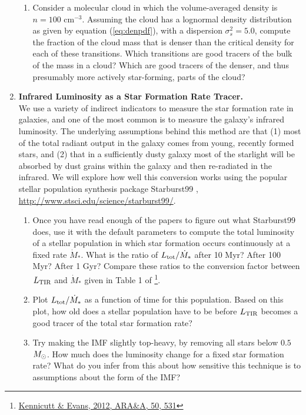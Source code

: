 \begin{enumerate}
\begin{enumerate}
\item Consider a molecular cloud in which the volume-averaged density is $n=100$ cm$^{-3}$. Assuming the cloud has a lognormal density distribution as given by equation (\ref{eq:denpdf}), with a dispersion $\sigma_s^2 = 5.0$, compute the fraction of the cloud mass that is denser than the critical density for each of these transitions. Which transitions are good tracers of the bulk of the mass in a cloud? Which are good tracers of the denser, and thus presumably more actively star-forming, parts of the cloud?
\end{enumerate} 

\vspace{0.2in}

\item \textbf{Infrared Luminosity as a Star Formation Rate Tracer.}\\
We use a variety of indirect indicators to measure the star formation rate in galaxies, and one of the most common is to measure the galaxy's infrared luminosity. The underlying assumptions behind this method are that (1) most of the total radiant output in the galaxy comes from young, recently formed stars, and (2) that in a sufficiently dusty galaxy most of the starlight will be absorbed by dust grains within the galaxy and then re-radiated in the infrared. We will explore how well this conversion works using the popular stellar population synthesis package Starburst99 \citep{leitherer99a, vazquez05a}, \url{http://www.stsci.edu/science/starburst99/}.
\begin{enumerate}
\item Once you have read enough of the papers to figure out what Starburst99 does, use it with the default parameters to compute the total luminosity of a stellar population in which star formation occurs continuously at a fixed rate $\dot{M}_*$. What is the ratio of $L_{\rm tot}/\dot{M}_*$ after 10 Myr? After 100 Myr? After 1 Gyr? Compare these ratios to the conversion factor between $L_{\rm TIR}$ and $\dot{M}_*$ given in Table 1 of \citet{kennicutt12a}\footnote{\href{http://adsabs.harvard.edu/abs/2012ARA\%26A..50..531K}{Kennicutt \& Evans, 2012, ARA\&A, 50, 531}}.
\item Plot $L_{\rm tot}/\dot{M}_*$ as a function of time for this population. Based on this plot, how old does a stellar population have to be before $L_{\rm TIR}$ becomes a good tracer of the total star formation rate?
\item Try making the IMF slightly top-heavy, by removing all stars below $0.5$ $M_{\odot}$. How much does the luminosity change for a fixed star formation rate? What do you infer from this about how sensitive this technique is to assumptions about the form of the IMF?
\end{enumerate}

\end{enumerate}
